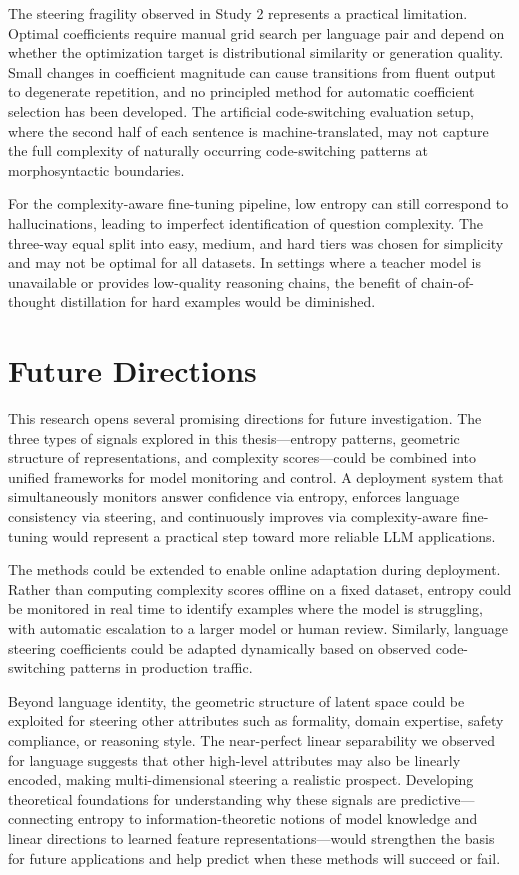 The steering fragility observed in Study 2 represents a practical limitation. Optimal coefficients require manual grid search per language pair and depend on whether the optimization target is distributional similarity or generation quality. Small changes in coefficient magnitude can cause transitions from fluent output to degenerate repetition, and no principled method for automatic coefficient selection has been developed. The artificial code-switching evaluation setup, where the second half of each sentence is machine-translated, may not capture the full complexity of naturally occurring code-switching patterns at morphosyntactic boundaries.

For the complexity-aware fine-tuning pipeline, low entropy can still correspond to hallucinations, leading to imperfect identification of question complexity. The three-way equal split into easy, medium, and hard tiers was chosen for simplicity and may not be optimal for all datasets. In settings where a teacher model is unavailable or provides low-quality reasoning chains, the benefit of chain-of-thought distillation for hard examples would be diminished.

\section{Future Directions}

This research opens several promising directions for future investigation. The three types of signals explored in this thesis---entropy patterns, geometric structure of representations, and complexity scores---could be combined into unified frameworks for model monitoring and control. A deployment system that simultaneously monitors answer confidence via entropy, enforces language consistency via steering, and continuously improves via complexity-aware fine-tuning would represent a practical step toward more reliable LLM applications.

The methods could be extended to enable online adaptation during deployment. Rather than computing complexity scores offline on a fixed dataset, entropy could be monitored in real time to identify examples where the model is struggling, with automatic escalation to a larger model or human review. Similarly, language steering coefficients could be adapted dynamically based on observed code-switching patterns in production traffic.

Beyond language identity, the geometric structure of latent space could be exploited for steering other attributes such as formality, domain expertise, safety compliance, or reasoning style. The near-perfect linear separability we observed for language suggests that other high-level attributes may also be linearly encoded, making multi-dimensional steering a realistic prospect. Developing theoretical foundations for understanding why these signals are predictive---connecting entropy to information-theoretic notions of model knowledge and linear directions to learned feature representations---would strengthen the basis for future applications and help predict when these methods will succeed or fail.

